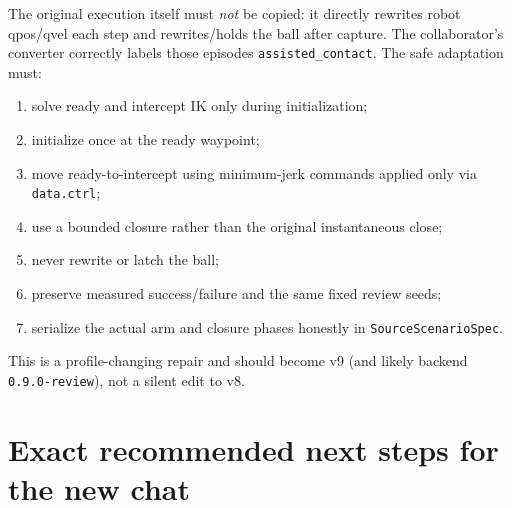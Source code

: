 \documentclass[11pt]{article}
\begin{document}
The original execution itself must \emph{not} be copied: it directly rewrites
robot qpos/qvel each step and rewrites/holds the ball after capture.  The
collaborator's converter correctly labels those episodes
\texttt{assisted\_contact}.  The safe adaptation must:

\begin{enumerate}
  \item solve ready and intercept IK only during initialization;
  \item initialize once at the ready waypoint;
  \item move ready-to-intercept using minimum-jerk commands applied only via
        \texttt{data.ctrl};
  \item use a bounded closure rather than the original instantaneous close;
  \item never rewrite or latch the ball;
  \item preserve measured success/failure and the same fixed review seeds;
  \item serialize the actual arm and closure phases honestly in
        \texttt{SourceScenarioSpec}.
\end{enumerate}

This is a profile-changing repair and should become v9 (and likely backend
\texttt{0.9.0-review}), not a silent edit to v8.

\section{Exact recommended next steps for the new chat}
\end{document}
